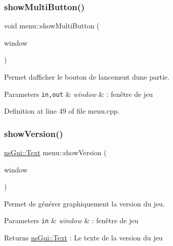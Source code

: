 \mbox{\label{namespacemenu_a6f05b2393e356d0d869a5628f5ce6cfc}} 
\subsubsection{\texorpdfstring{show\+Multi\+Button()}{showMultiButton()}}
{\footnotesize\ttfamily void menu\+::show\+Multi\+Button (\begin{DoxyParamCaption}\item[{\hyperlink{class_min_g_l}{Min\+GL} \&}]{window }\end{DoxyParamCaption})}



Permet d\textquotesingle{}afficher le bouton de lancement d\textquotesingle{}une partie. 


\begin{DoxyParams}[1]{Parameters}
\mbox{\tt in,out}  & {\em window} & \+: fenêtre de jeu \\
\hline
\end{DoxyParams}


Definition at line 49 of file menu.\+cpp.

\mbox{\label{namespacemenu_a21d691d0add1d6f576dd31dd77104005}} 
\subsubsection{\texorpdfstring{show\+Version()}{showVersion()}}
{\footnotesize\ttfamily \hyperlink{classns_gui_1_1_text}{ns\+Gui\+::\+Text} menu\+::show\+Version (\begin{DoxyParamCaption}\item[{\hyperlink{class_min_g_l}{Min\+GL} \&}]{window }\end{DoxyParamCaption})}



Permet de générer graphiquement la version du jeu. 


\begin{DoxyParams}[1]{Parameters}
\mbox{\tt in}  & {\em window} & \+: fenêtre de jeu \\
\hline
\end{DoxyParams}
\begin{DoxyReturn}{Returns}
\hyperlink{classns_gui_1_1_text}{ns\+Gui\+::\+Text} \+: Le texte de la version du jeu 
\end{DoxyReturn}


